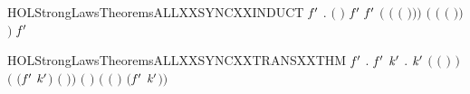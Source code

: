 \newcommand{\HOLStrongLawsTheoremsALLXXSYNCXXcompute}{\UseVerbatim{HOLStrongLawsTheoremsALLXXSYNCXXcompute}}
\begin{SaveVerbatim}{HOLStrongLawsTheoremsALLXXSYNCXXINDUCT}
\HOLTokenTurnstile{} \HOLSymConst{\HOLTokenForall{}}  \ensuremath{\HOLBoundVar{f}\sp{\prime}} .
         \ensuremath{(} \ensuremath{)} \ensuremath{\HOLBoundVar{f}\sp{\prime}}  \HOLSymConst{\ensuremath{=}}
          \ensuremath{\HOLBoundVar{f}\sp{\prime}}  \HOLSymConst{\ensuremath{+}}
        \ensuremath{(} \ensuremath{(} \ensuremath{(} \ensuremath{)}\ensuremath{)}\ensuremath{)} \ensuremath{(} \ensuremath{(} \ensuremath{(} \ensuremath{)}\ensuremath{)}\ensuremath{)} \ensuremath{\HOLBoundVar{f}\sp{\prime}} 
\end{SaveVerbatim}
\newcommand{\HOLStrongLawsTheoremsALLXXSYNCXXINDUCT}{\UseVerbatim{HOLStrongLawsTheoremsALLXXSYNCXXINDUCT}}
\begin{SaveVerbatim}{HOLStrongLawsTheoremsALLXXSYNCXXTRANSXXTHM}
\HOLTokenTurnstile{} \HOLSymConst{\HOLTokenForall{}}   \ensuremath{\HOLBoundVar{f}\sp{\prime}}  .
          \ensuremath{\HOLBoundVar{f}\sp{\prime}}  \HOLTokenTransBegin{}\HOLTokenTransEnd {} \HOLSymConst{\HOLTokenImp{}}
       \HOLSymConst{\HOLTokenExists{}} \ensuremath{\HOLBoundVar{k}\sp{\prime}} .
            \HOLSymConst{\HOLTokenLeq{}}  \HOLSymConst{\HOLTokenConj{}} \ensuremath{\HOLBoundVar{k}\sp{\prime}} \HOLSymConst{\HOLTokenLeq{}}  \HOLSymConst{\HOLTokenConj{}} \ensuremath{(} \ensuremath{(} \ensuremath{)} \HOLSymConst{\ensuremath{=}}  \ensuremath{)} \HOLSymConst{\HOLTokenConj{}}
           \ensuremath{(} \ensuremath{(}\ensuremath{\HOLBoundVar{f}\sp{\prime}} \ensuremath{\HOLBoundVar{k}\sp{\prime}}\ensuremath{)} \HOLSymConst{\ensuremath{=}}  \ensuremath{(} \ensuremath{)}\ensuremath{)} \HOLSymConst{\HOLTokenConj{}} \ensuremath{(} \HOLSymConst{\ensuremath{=}} \HOLConst{\ensuremath{\tau}}\ensuremath{)} \HOLSymConst{\HOLTokenConj{}}
           \ensuremath{(} \HOLSymConst{\ensuremath{=}}  \ensuremath{(} \ensuremath{)} \HOLSymConst{\ensuremath{\mid}}  \ensuremath{(}\ensuremath{\HOLBoundVar{f}\sp{\prime}} \ensuremath{\HOLBoundVar{k}\sp{\prime}}\ensuremath{)}\ensuremath{)}
\end{SaveVerbatim}
